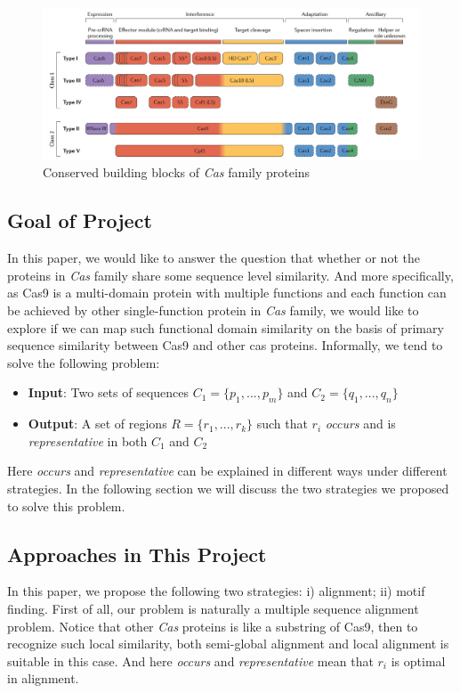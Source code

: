 \documentclass[11pt, oneside]{article}
\begin{document}
\begin{figure}[ht]
  \centering
  \includegraphics[scale = 0.35]{images/buildingBlocks}
      \caption{Conserved building blocks of \textit{Cas} family proteins \cite{cas:makarova}}
      \label{buildingBlocks}
\end{figure}

\subsection{Goal of Project}

In this paper, we would like to answer the question that whether or not the proteins in \textit{Cas} family share some sequence level similarity. And more specifically, as Cas9 is a multi-domain protein with multiple functions and each function can be achieved by other single-function protein in \textit{Cas} family, we would like to explore if we can map such functional domain similarity on the basis of primary sequence similarity between Cas9 and other cas proteins. Informally, we tend to solve the following problem:
\begin{itemize}
	\item \textbf{Input}: Two sets of sequences $C_1 = \{p_1, ..., p_m\}$ and $C_2 = \{q_1, ..., q_n\}$
	\item \textbf{Output}: A set of regions $R = \{r_1, ..., r_k\}$ such that $r_i$ \textit{occurs} and is \textit{representative} in both $C_1$ and $C_2$ 
\end{itemize}
Here \textit{occurs} and \textit{representative} can be explained in different ways under different strategies. In the following section we will discuss the two strategies we proposed to solve this problem.

\subsection{Approaches in This Project}

In this paper, we propose the following two strategies: i) alignment; ii) motif finding. First of all, our problem is naturally a multiple sequence alignment problem. Notice that other \textit{Cas} proteins is like a substring of Cas9, then to recognize such local similarity, both semi-global alignment and local alignment is suitable in this case. And here \textit{occurs} and \textit{representative} mean that $r_i$ is optimal in alignment.  
\end{document}
